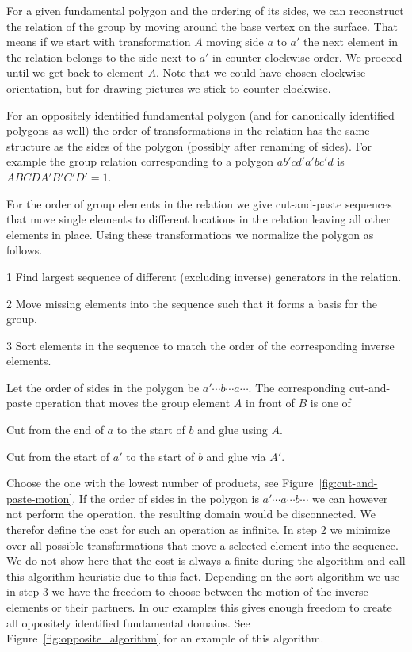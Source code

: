 \documentclass[Thesis]{subfiles}
\begin{document}
For a given fundamental polygon and the ordering of its sides, we can reconstruct the relation of the group by moving around the base vertex on the surface. That means if we start with transformation $A$ moving side $a$ to $a'$ the next element in the relation belongs to the side next to $a'$ in counter-clockwise order. We proceed until we get back to element $A$. Note that we could have chosen clockwise orientation, but for drawing pictures we stick to counter-clockwise.

For an oppositely identified fundamental polygon (and for canonically identified polygons as well) the order of transformations in the relation has the same structure as the sides of the polygon (possibly after renaming of sides). For example the group relation corresponding to a polygon $ab'cd'a'bc'd$ is $ABCDA'B'C'D'=1$.

For the order of group elements in the relation we give cut-and-paste sequences that move single elements to different locations in the relation leaving all other elements in place. Using these transformations we normalize the polygon as follows.

\begin{compactitem}
\item[1] Find largest sequence of different (excluding inverse) generators in the relation.
\item[2] Move missing elements into the sequence such that it forms a basis for the group.
\item[3] Sort elements in the sequence to match the order of the corresponding inverse elements.
\end{compactitem}

Let the order of sides in the polygon be $a' \cdots b \cdots a \cdots$. The corresponding cut-and-paste operation that moves the group element $A$ in front of $B$ is one of

\begin{compactitem}
\item Cut from the end of $a$ to the start of $b$ and glue using $A$.
\item Cut from the start of $a'$ to the start of $b$ and glue via $A'$.
\end{compactitem}

Choose the one with the lowest number of products, see Figure~\ref{fig:cut-and-paste-motion}. If the order of sides in the polygon is $a' \cdots a \cdots b \cdots$ we can however not perform the operation, the resulting domain would be disconnected. We therefor define the cost for such an operation as infinite. In step 2 we minimize over all possible transformations that move a selected element into the sequence. We do not show here that the cost is always a finite during the algorithm and call this algorithm heuristic due to this fact. Depending on the sort algorithm we use in step 3 we have the freedom to choose between the motion of the inverse elements or their partners. In our examples this gives enough freedom to create all oppositely identified fundamental domains. See Figure~\ref{fig:opposite_algorithm} for an example of this algorithm.
\end{document}
